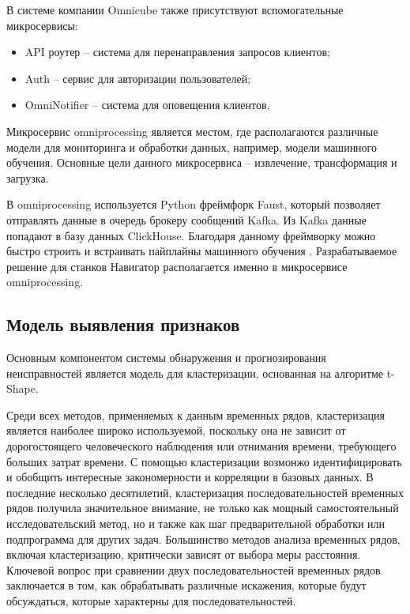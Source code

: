 В системе компании Omnicube также присутствуют вспомогательные микросервисы:

\begin{itemize}
    \item API роутер -- система для перенаправления запросов клиентов;
    \item Auth -- сервис для авторизации пользователей;
    \item OmniNotifier -- система для оповещения клиентов.
\end{itemize}

Микросервис omniprocessing является местом, где располагаются различные модели для мониторинга и обработки данных,
например, модели машинного обучения.
Основные цели данного микросервиса -- извлечение, трансформация и загрузка.

В omniprocessing используется Python фреймфорк Faust, который позволяет отправлять
данные в очередь брокеру сообщений Kafka. Из Kafka данные попадают в базу данных ClickHouse.
Благодаря данному фреймворку можно быстро строить и встраивать пайплайны машинного обучения \cite{faust}. 
Разрабатываемое решение для станков Навигатор располагается именно
в микросервисе omniprocessing.

\subsection{Модель выявления признаков}

Основным компонентом системы обнаружения и прогнозирования
неисправностей является модель для кластеризации,
основанная на алгоритме t-Shape.

Среди всех методов, применяемых к данным временных рядов, кластеризация является наиболее широко используемой,
поскольку она не зависит от дорогостоящего человеческого наблюдения или отнимания времени, требующего больших затрат времени. 
С помощью кластеризации возмонжо идентифицировать и обобщить интересные закономерности и корреляции в базовых данных.
В последние несколько десятилетий, кластеризация последовательностей временных рядов получила значительное внимание,
не только как мощный самостоятельный исследовательский метод, но и также как шаг предварительной обработки 
или подпрограмма для других задач. Большинство методов анализа временных рядов, включая кластеризацию, 
критически зависят от выбора меры расстояния. Ключевой вопрос при сравнении двух последовательностей 
временных рядов заключается в том, как обрабатывать различные искажения, 
которые будут обсуждаться, которые характерны для последовательностей.


